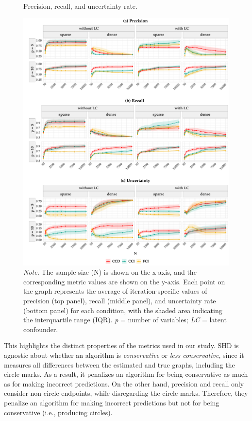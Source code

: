 \documentclass[twoside, 11pt]{article}
\begin{document}
\begin{figure}[!htbp]
    \centering
        \caption{Precision, recall, and uncertainty rate.}
        \vspace{1mm}
        \includegraphics[width=1\textwidth]{figures/prec-recall-uncer_alpha0.01.pdf}
        \vspace*{-4mm}
        \caption*{\small{\textit{Note.} The sample size (N) is shown on the x-axis, and the corresponding metric values are shown on the y-axis. Each point on the graph represents the average of iteration-specific values of precision (top panel), recall (middle panel), and uncertainty rate (bottom panel) for each condition, with the shaded area indicating the interquartile range (IQR). \textit{p} = number of variables; \textit{LC} = latent confounder.}}
    \label{fig:14}
\end{figure}
This highlights the distinct properties of the metrics used in our study. 
SHD is agnostic about whether an algorithm is \textit{conservative} or \textit{less conservative}, since it measures all differences between the estimated and true graphs, including the circle marks. As a result, it penalizes an algorithm for being conservative as much as for making incorrect predictions.
On the other hand, precision and recall only consider non-circle endpoints, while disregarding the circle marks. Therefore, they penalize an algorithm for making incorrect predictions but not for being conservative (i.e., producing circles).
\end{document}
